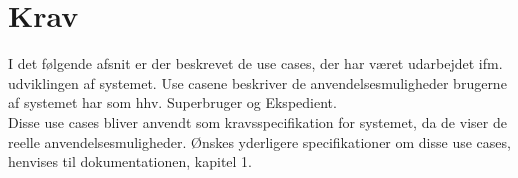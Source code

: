 \chapter{Krav}
I det følgende afsnit er der beskrevet de use cases, der har været udarbejdet ifm. udviklingen af systemet. Use casene beskriver de anvendelsesmuligheder brugerne af systemet har som hhv. Superbruger og Ekspedient.\\
Disse use cases bliver anvendt som kravsspecifikation for systemet, da de viser de reelle anvendelsesmuligheder. Ønskes yderligere specifikationer om disse use cases, henvises til dokumentationen, kapitel 1.


